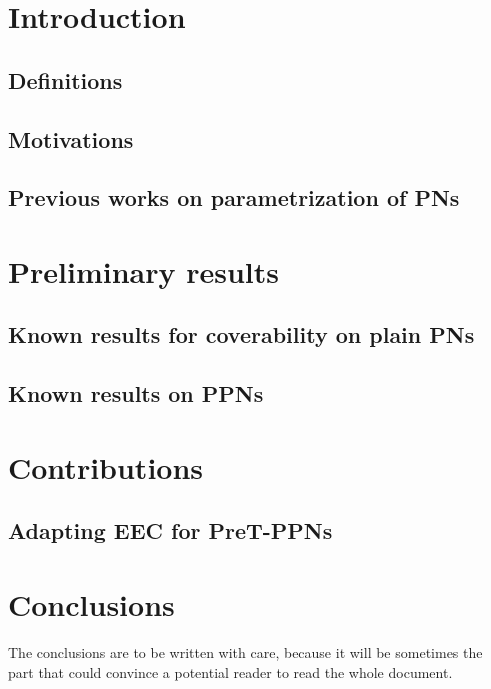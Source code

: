 \documentclass[11pt,a4paper,oneside,draft]{book}
\theoremstyle{plain}
\theoremstyle{definition}
\theoremstyle{remark}
\begin{document}
\thispagestyle{empty} 
\setcounter{page}{0}
\tableofcontents
\acresetall

\mainmatter
\setcounter{page}{1}

\chapter{Introduction}

\section{Definitions}

\section{Motivations}


\section{Previous works on parametrization of \acp{PN}}


\chapter{Preliminary results}
\section{Known results for coverability on plain \acp{PN}}

\section{Known results on \acp{PPN}}


\chapter{Contributions}
\section{Adapting \ac{EEC} for PreT-\acp{PPN}}

\vspace*{0.5cm}
\chapter*{Conclusions}

The conclusions are to be written with care, because it will be sometimes the part that could convince a potential reader to read the whole document.

\appendix

\backmatter

\printindex %



\end{document}
